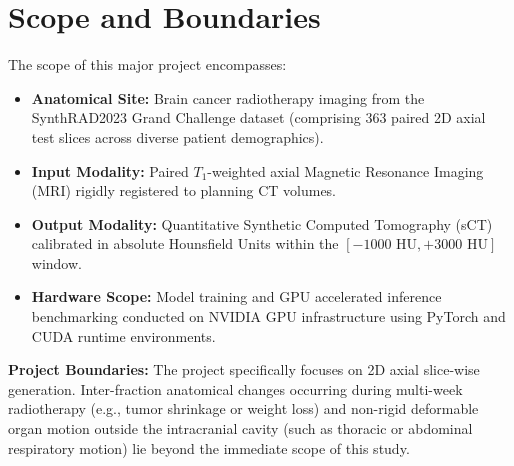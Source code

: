 \section{Scope and Boundaries}
The scope of this major project encompasses:
\begin{itemize}
    \item \textbf{Anatomical Site:} Brain cancer radiotherapy imaging from the SynthRAD2023 Grand Challenge dataset (comprising 363 paired 2D axial test slices across diverse patient demographics).
    \item \textbf{Input Modality:} Paired $T_1$-weighted axial Magnetic Resonance Imaging (MRI) rigidly registered to planning CT volumes.
    \item \textbf{Output Modality:} Quantitative Synthetic Computed Tomography (sCT) calibrated in absolute Hounsfield Units within the $[-1000\text{ HU}, +3000\text{ HU}]$ window.
    \item \textbf{Hardware Scope:} Model training and GPU accelerated inference benchmarking conducted on NVIDIA GPU infrastructure using PyTorch and CUDA runtime environments.
\end{itemize}

\noindent \textbf{Project Boundaries:} The project specifically focuses on 2D axial slice-wise generation. Inter-fraction anatomical changes occurring during multi-week radiotherapy (e.g., tumor shrinkage or weight loss) and non-rigid deformable organ motion outside the intracranial cavity (such as thoracic or abdominal respiratory motion) lie beyond the immediate scope of this study.

